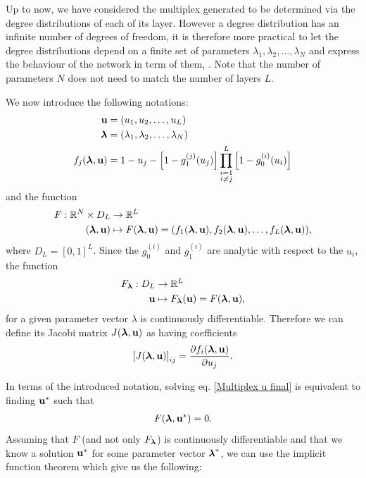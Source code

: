 \documentclass[a4paper]{article}
\begin{document}
Up to now, we have considered the multiplex generated to be determined via the degree distributions of each of its layer. However a degree distribution has an infinite number of degrees of freedom, it is therefore more practical to let the degree distributions depend on a finite set of parameters $\lambda_1, \lambda_2, \dots, \lambda_N$ and express the behaviour of the network in term of them, . Note that the number of parameters $N$ does not need to match the number of layers $L$.

We now introduce the following notations:
\begin{align}
	\boldsymbol{\mathrm{u}} &= (u_1, u_2, \dots, u_L) \\
	\boldsymbol{\mathrm{\lambda}} &= (\lambda_1, \lambda_2, \dots, \lambda_N) \\
	f_j(\boldsymbol{\mathrm{\lambda}}, \boldsymbol{\mathrm{u}}) &= 1 - u_j - \left[1 - g_1^{(j)}(u_j) \right] \prod_{\substack{i = 1 \\ i \neq j}}^{L}  \left[1 - g_0^{(i)}(u_i) \right] \label{Definition fj}
\end{align}
and the function
\begin{align}
	F : \mathbb{R}^N \times D_L &\rightarrow \mathbb{R}^L \\
	(\boldsymbol{\mathrm{\lambda}}, \boldsymbol{\mathrm{u}}) &\mapsto F(\boldsymbol{\mathrm{\lambda}}, \boldsymbol{\mathrm{u}}) = (f_1(\boldsymbol{\mathrm{\lambda}}, \boldsymbol{\mathrm{u}}), f_2(\boldsymbol{\mathrm{\lambda}}, \boldsymbol{\mathrm{u}}), \dots, f_L(\boldsymbol{\mathrm{\lambda}}, \boldsymbol{\mathrm{u}})), \label{Definition F}
\end{align}
where $D_L = [0, 1]^L$. Since the $g_0^{(i)}$ and $g_1^{(i)}$ are analytic with respect to the $u_i$, the function
\begin{align}
	F_{\boldsymbol{\mathrm{\lambda}}} : D_L &\rightarrow \mathbb{R}^L\\
		\boldsymbol{\mathrm{u}} &\mapsto F_{\boldsymbol{\mathrm{\lambda}}}(\boldsymbol{\mathrm{u}}) = F(\boldsymbol{\mathrm{\lambda}}, \boldsymbol{\mathrm{u}}),
\end{align}
for a given parameter vector $\lambda$ is continuously differentiable. Therefore we can define its Jacobi matrix $J(\boldsymbol{\mathrm{\lambda}}, \boldsymbol{\mathrm{u}})$ as having coefficients
\begin{align}
	\left[ J(\boldsymbol{\mathrm{\lambda}}, \boldsymbol{\mathrm{u}}) \right]_{ij} = \frac{\partial f_i(\boldsymbol{\mathrm{\lambda}},\boldsymbol{\mathrm{u}})}{\partial u_j}.
\end{align}

In terms of the introduced notation, solving eq. \eqref{Multiplex u final} is equivalent to finding $\boldsymbol{\mathrm{u}}^*$ such that
\begin{align}
	F(\boldsymbol{\mathrm{\lambda}}, \boldsymbol{\mathrm{u}}^*) = 0.
\end{align}
Assuming that $F$ (and not only $F_{\boldsymbol{\mathrm{\lambda}}}$) is continuously differentiable and that we know a solution $\boldsymbol{\mathrm{u}}^*$ for some parameter vector $\boldsymbol{\mathrm{\lambda}}^*$, we can use the implicit function theorem which give us the following:
\end{document}
